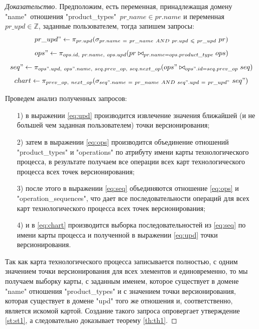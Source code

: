 \begin{proof}[Доказательство]
	\indent Предположим, есть переменная, принадлежащая домену "name"\ отношения "product\_types"\ $pr\_name \in pr.name$ и переменная $pr\_upd \in \mathbb{Z}$, заданные пользователем, тогда запишем запросы:
	\begin{equation}
		\label{eq:upd}
		pr\_upd" \leftarrow \pi_{pr.upd}(\sigma_{pr.name\ =\ pr\_name\ AND\ pr.upd\ \leq\ pr\_upd}\ pr)
	\end{equation}
	\begin{equation}
		\label{eq:ops}
		ops" \leftarrow \pi_{ops.id,\ pr.name,\ ops.upd}(pr \bowtie_{pr.name = ops.product\_type} ops)
	\end{equation}
	\begin{equation}
		\label{eq:seq}
		seq" \leftarrow \pi_{ops".upd,\ ops".name,\ seq.prev\_op,\ seq.next\_op}(ops" \bowtie_{ops".id = seq.prev\_op} seq)
	\end{equation}
	\begin{equation}
		\label{eq:chart}
		chart \leftarrow \pi_{prev\_op,\ next\_op} (\sigma_{seq".name\ =\ pr\_name\ AND\ seq".upd\ =\ pr\_upd"\ } seq")
	\end{equation}

	\indent Проведем анализ полученных запросов:
	\begin{enumerate}
		\item[1)] в выражении \ref{eq:upd} производится извлечение значения ближайшей (и не большей чем заданная пользователем) точки версионирования;
		\item[2)] затем в выражении \ref{eq:ops} производится объединение отношений "product\_types" и "operations" по атрибуту имени карты технологического процесса, в результате получаем все операции всех карт технологического процесса всех точек версионирования;
		\item[3)] после этого в выражении \ref{eq:seq} объединяются отношение \ref{eq:ops} и "operation\_sequences", что дает все последовательности операций для всех карт технологического процесса всех точек версионирования;
		\item[4)] и в \ref{eq:chart} производится выборка последовательностей из \ref{eq:seq} по имени карты процесса и полученной в выражении \ref{eq:upd} точки версионирования.
	\end{enumerate}

	\indent Так как карта технологического процесса записывается полностью, с одним значением точки версионирования для всех элементов и единовременно, то мы получаем выборку карты, с заданным именем, которое существует в домене "name" отношения "product\_types" и с значением точки версионирования, которая существует в домене "upd" того же отношения и, соответственно, является искомой картой.
	Создание такого запроса опровергает утверждение \ref{st:st1}, а следовательно доказывает теорему \ref{th:th1}.
\end{proof}